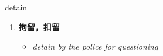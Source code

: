
\begin{frame}
{\huge detain}
\begin{center}
\begin{enumerate}\Large
  \item \textbf{拘留，扣留}
  \begin{itemize}
    \item \em{\Large{detain by the police for questioning}}
  \end{itemize}
\end{enumerate}
\end{center}
\end{frame}
